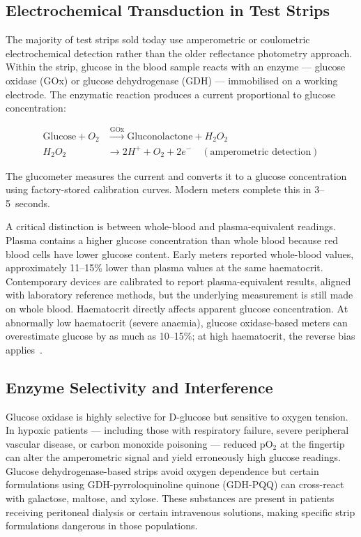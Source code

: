 \subsection*{Electrochemical Transduction in Test Strips}

The majority of test strips sold today use amperometric or coulometric electrochemical detection rather than the older reflectance photometry approach. Within the strip, glucose in the blood sample reacts with an enzyme --- glucose oxidase (GOx) or glucose dehydrogenase (GDH) --- immobilised on a working electrode. The enzymatic reaction produces a current proportional to glucose concentration:

\begin{align}
\text{Glucose} + O_2 &\xrightarrow{\text{GOx}} \text{Gluconolactone} + H_2O_2 \\
H_2O_2 &\rightarrow 2H^+ + O_2 + 2e^- \quad (\text{amperometric detection})
\end{align}

The glucometer measures the current and converts it to a glucose concentration using factory-stored calibration curves. Modern meters complete this in 3--5~seconds.

A critical distinction is between whole-blood and plasma-equivalent readings. Plasma contains a higher glucose concentration than whole blood because red blood cells have lower glucose content. Early meters reported whole-blood values, approximately 11--15\% lower than plasma values at the same haematocrit. Contemporary devices are calibrated to report plasma-equivalent results, aligned with laboratory reference methods, but the underlying measurement is still made on whole blood. Haematocrit directly affects apparent glucose concentration. At abnormally low haematocrit (severe anaemia), glucose oxidase-based meters can overestimate glucose by as much as 10--15\%; at high haematocrit, the reverse bias applies~\cite{freckmann2022mard}.

\subsection*{Enzyme Selectivity and Interference}

Glucose oxidase is highly selective for D-glucose but sensitive to oxygen tension. In hypoxic patients --- including those with respiratory failure, severe peripheral vascular disease, or carbon monoxide poisoning --- reduced pO$_2$ at the fingertip can alter the amperometric signal and yield erroneously high glucose readings. Glucose dehydrogenase-based strips avoid oxygen dependence but certain formulations using GDH-pyrroloquinoline quinone (GDH-PQQ) can cross-react with galactose, maltose, and xylose. These substances are present in patients receiving peritoneal dialysis or certain intravenous solutions, making specific strip formulations dangerous in those populations.

